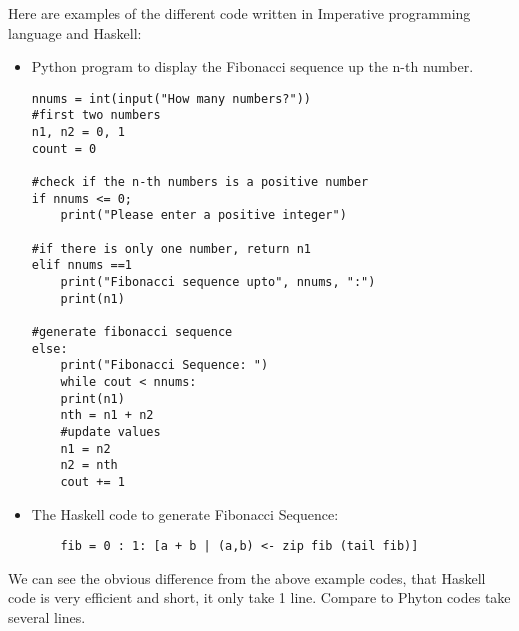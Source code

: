 \documentclass{article}
\begin{document}
\medskip\noindent
Here are examples of the different code written in Imperative programming language and Haskell:
\begin{itemize}
\item Python program to display the Fibonacci sequence up the n-th number.
\begin{lstlisting}
nnums = int(input("How many numbers?"))
#first two numbers
n1, n2 = 0, 1
count = 0

#check if the n-th numbers is a positive number 
if nnums <= 0;
	print("Please enter a positive integer")
	
#if there is only one number, return n1
elif nnums ==1
	print("Fibonacci sequence upto", nnums, ":")
	print(n1)
	
#generate fibonacci sequence
else:
	print("Fibonacci Sequence: ")
	while cout < nnums:
	print(n1)
	nth = n1 + n2
	#update values 
	n1 = n2
	n2 = nth 
	cout += 1
\end{lstlisting}
\item The Haskell code to generate Fibonacci Sequence:
\begin{lstlisting}
	fib = 0 : 1: [a + b | (a,b) <- zip fib (tail fib)]
\end{lstlisting}
\end{itemize}
We can see the obvious difference from the above example codes, that Haskell code is very efficient and short, it only take 1 line. Compare to Phyton codes take several lines. 
\end{document}
